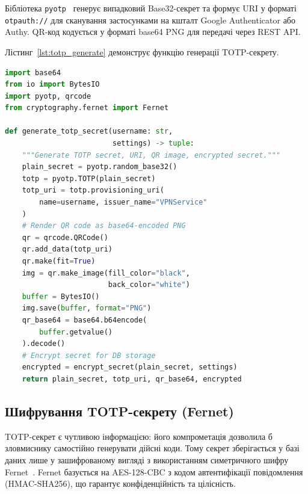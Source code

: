 Бібліотека \texttt{pyotp}~\cite{pyotp2024} генерує випадковий Base32-секрет та
формує URI у форматі \texttt{otpauth://} для сканування застосунками на
кшталт Google Authenticator або Authy. QR-код кодується у форматі base64
PNG для передачі через REST API.

Лістинг~\ref{lst:totp_generate} демонструє функцію генерації TOTP-секрету.

\begin{lstlisting}[style=mystyle, language=Python,
  caption={Генерація TOTP-секрету та QR-коду},
  label={lst:totp_generate}]
import base64
from io import BytesIO
import pyotp, qrcode
from cryptography.fernet import Fernet

def generate_totp_secret(username: str,
                         settings) -> tuple:
    """Generate TOTP secret, URI, QR image, encrypted secret."""
    plain_secret = pyotp.random_base32()
    totp = pyotp.TOTP(plain_secret)
    totp_uri = totp.provisioning_uri(
        name=username, issuer_name="VPNService"
    )
    # Render QR code as base64-encoded PNG
    qr = qrcode.QRCode()
    qr.add_data(totp_uri)
    qr.make(fit=True)
    img = qr.make_image(fill_color="black",
                        back_color="white")
    buffer = BytesIO()
    img.save(buffer, format="PNG")
    qr_base64 = base64.b64encode(
        buffer.getvalue()
    ).decode()
    # Encrypt secret for DB storage
    encrypted = encrypt_secret(plain_secret, settings)
    return plain_secret, totp_uri, qr_base64, encrypted
\end{lstlisting}

\subsection{Шифрування TOTP-секрету (Fernet)}

TOTP-секрет є чутливою інформацією: його компрометація дозволила б зловмиснику
самостійно генерувати дійсні коди. Тому секрет зберігається у базі даних
лише у зашифрованому вигляді з використанням симетричного шифру
Fernet~\cite{cryptography_fernet}. Fernet базується на AES-128-CBC з кодом
автентифікації повідомлення (HMAC-SHA256), що гарантує конфіденційність та цілісність.

